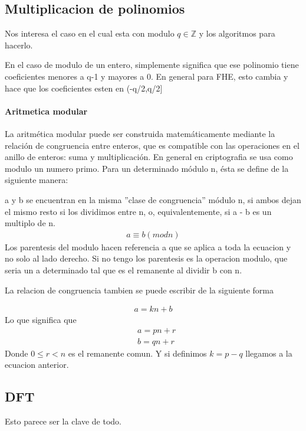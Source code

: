 \documentclass[12pt, oneside]{article}
\newcommand{\Z}{\mathbb{Z}}
\begin{document}
\subsection{Multiplicacion de polinomios}
Nos interesa el caso en el cual esta con modulo $q \in \Z$ y los algoritmos para hacerlo.

En el caso de modulo de un entero, simplemente significa que ese polinomio tiene coeficientes
menores a q-1 y mayores a 0.
En general para FHE, esto cambia y hace que los coeficientes esten en (-q/2,q/2]

\paragraph{Aritmetica modular}
La aritmética modular puede ser construida matemáticamente mediante la relación de
congruencia entre enteros, que es compatible con las operaciones en el anillo de enteros:
suma y multiplicación.
En general en criptografia se usa como modulo un numero primo.
Para un determinado módulo n, ésta se define de la siguiente manera:

a y b se encuentran en la misma ''clase de congruencia'' módulo n, si ambos dejan
el mismo resto si los dividimos entre n, o, equivalentemente, si a - b es un multiplo de n.
\begin{align*}
a\equiv b (mod n)
\end{align*}
Los parentesis del modulo hacen referencia a que se aplica a toda la ecuacion y no
solo al lado derecho.
Si no tengo los parentesis es la operacion modulo, que seria un a determinado tal que
es el remanente al dividir b con n.

La relacion de congruencia tambien se puede escribir de la siguiente forma

\begin{align*}
  a = kn + b
\end{align*}
Lo que significa que
\begin{align*}
  &a = pn + r \\
  &b = qn + r
\end{align*}
Donde $0\leq r <n$ es el remanente comun.
Y si definimos $k=p-q$ llegamos a la ecuacion anterior.
\subsection{DFT}
Esto parece ser la clave de todo.
\end{document}
